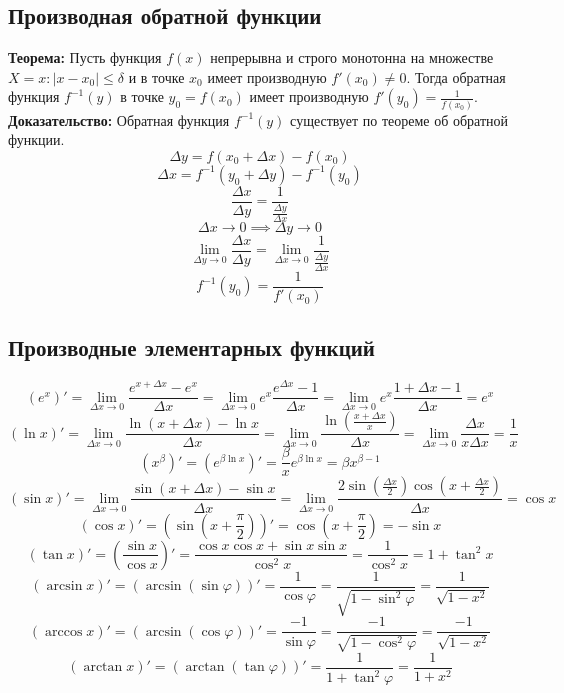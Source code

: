 \documentclass{article}
\newcommand{\theorem}{\textbf{Теорема:} }
\newcommand{\proof}{\textbf{Доказательство:} }
\begin{document}
    \subsection*{Производная обратной функции}
        \theorem Пусть функция $f(x)$ непрерывна и строго монотонна на множестве $X = {x: |x - x_0| \le \delta}$ и в точке $x_0$ имеет производную $f'(x_0) \neq 0$.
        Тогда обратная функция $f^{-1}(y)$ в точке $y_0 = f(x_0)$ имеет производную $f'(y_0) = \frac{1}{f(x_0)}$.
        \\
        \proof
        Обратная функция $f^{-1}(y)$ существует по теореме об обратной функции.
        \\
        \[ \Delta y = f(x_0 + \Delta x) - f(x_0) \]
        \[ \Delta x = f^{-1}(y_0 + \Delta y) - f^{-1}(y_0) \]
        \[ \frac{\Delta x}{\Delta y} = \frac{1}{\frac{\Delta y}{\Delta x}} \]
        \[ \Delta x \to 0 \implies \Delta y \to 0 \]
        \[ \lim_{\Delta y \to 0} \frac{\Delta x}{\Delta y} = \lim_{\Delta x \to 0} \frac{1}{\frac{\Delta y}{\Delta x}} \]
        \[ f^{-1}(y_0) = \frac{1}{f'(x_0)} \]
         
        
    \subsection*{Производные элементарных функций}
        \[ (e^x)' = \lim_{\Delta x \to 0} \frac{e^{x + \Delta x} - e^x}{\Delta x} = \lim_{\Delta x \to 0} e^x \frac{e^{\Delta x} - 1}{\Delta x} =
            \lim_{\Delta x \to 0} e^x \frac{1 + \Delta x - 1}{\Delta x} = e^x \]
        \[ (\ln x)' = \lim_{\Delta x \to 0} \frac{ \ln (x + \Delta x) - \ln x} {\Delta x} = \lim_{\Delta x \to 0} \frac {\ln (\frac{x + \Delta x}{x})} {\Delta x} =
           \lim_{\Delta x \to 0} \frac {\Delta x} {x \Delta x} = \frac{1}{x} \]
        \[ (x^{\beta})' = (e^{\beta \ln x})' = \frac{\beta}{x} e^{\beta \ln x} = \beta x^{\beta - 1} \]
        \[ (\sin x)' = \lim_{\Delta x \to 0} \frac{\sin (x + \Delta x) - \sin x} {\Delta x} =
        \lim_{\Delta x \to 0} \frac{2 \sin \left( \frac {\Delta x} {2} \right) \cos \left(x + \frac{\Delta x}{2} \right)} {\Delta x} = \cos x \]
        \[ (\cos x)' = (\sin (x + \frac{\pi}{2}))' = \cos (x + \frac{\pi}{2}) = - \sin x \]
        \[ (\tan x)' = (\frac{\sin x}{\cos x})' = \frac{\cos x \cos x + \sin x \sin x}{\cos^2 x} = \frac{1}{\cos^2 x} = 1 + \tan^2 x \]
        \[ (\arcsin x)' = (\arcsin \left( \sin \varphi \right))' = \frac{1}{\cos \varphi} = \frac{1}{\sqrt{1 - \sin^2 \varphi}} = \frac{1}{\sqrt{1 - x^2}} \]
        \[ (\arccos x)' = (\arcsin \left( \cos \varphi \right))' = \frac{-1}{\sin \varphi} = \frac{-1}{\sqrt{1 - \cos^2 \varphi}} = \frac{-1}{\sqrt{1 - x^2}} \]
        \[ (\arctan x)' = (\arctan \left( \tan \varphi \right))' = \frac{1}{1 + \tan^2 \varphi} = \frac{1}{1 + x^2} \]
        
\end{document}
